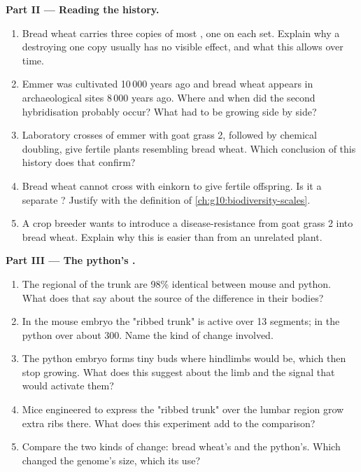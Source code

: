 \begin{problem}
\medskip
\noindent\textbf{Part II --- Reading the history.}
\begin{enumerate}[resume]
  \item Bread wheat carries three copies of most , one on each
        set. Explain why a  destroying one copy usually has no
        visible effect, and what this allows over time.
  \item Emmer was cultivated 10\,000 years ago and bread wheat appears
        in archaeological sites 8\,000 years ago. Where and when did
        the second hybridisation probably occur? What had to be
        growing side by side?
  \item Laboratory crosses of emmer with goat grass 2, followed by
        chemical doubling, give fertile plants resembling bread wheat.
        Which conclusion of this history does that confirm?
  \item Bread wheat cannot cross with einkorn to give fertile
        offspring. Is it a separate ? Justify with the
        definition of \cref{ch:g10:biodiversity-scales}.
  \item A crop breeder wants to introduce a disease-resistance 
        from goat grass 2 into bread wheat. Explain why this is easier
        than from an unrelated plant.
\end{enumerate}

\medskip
\noindent\textbf{Part III --- The python's .}
\begin{enumerate}[resume]
  \item The regional  of the trunk are 98\% identical between
        mouse and python. What does that say about the source of the
        difference in their bodies?
  \item In the mouse embryo the "ribbed trunk"  is active over 13
        segments; in the python over about 300. Name the kind of
        change involved.
  \item The python embryo forms tiny buds where hindlimbs would be,
        which then stop growing. What does this suggest about the
        limb  and the signal that would activate them?
  \item Mice engineered to express the "ribbed trunk"  over the
        lumbar region grow extra ribs there. What does this experiment
        add to the comparison?
  \item Compare the two kinds of change: bread wheat's and the
        python's. Which changed the genome's size, which its use?
\end{enumerate}


\end{problem}
